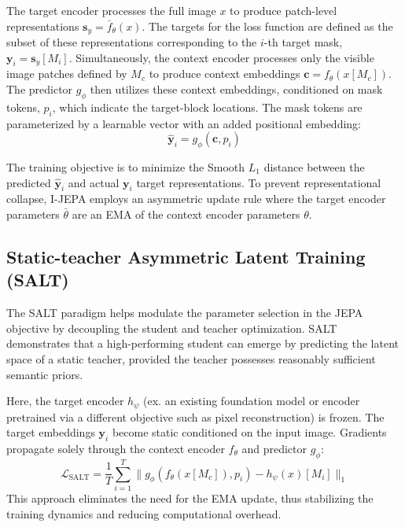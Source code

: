\documentclass{article}
\theoremstyle{plain}
\theoremstyle{definition}
\theoremstyle{remark}
\begin{document}
The target encoder processes the full image $x$ to produce patch-level representations $\mathbf{s}_y = \bar{f}_\theta(x)$. The targets for the loss function are defined as the subset of these representations corresponding to the $i$-th target mask, $\mathbf{y}_i = \mathbf{s}_y[M_i]$. Simultaneously, the context encoder processes only the visible image patches defined by $M_c$ to produce context embeddings $\mathbf{c} = f_\theta(x[M_c])$. The predictor $g_\phi$ then utilizes these context embeddings, conditioned on mask tokens, $p_i$, which indicate the target-block locations. The mask tokens are parameterized by a learnable vector with an added positional embedding:
\begin{equation}
    \hat{\mathbf{y}}_i = g_\phi(\mathbf{c}, p_i)
\end{equation}

The training objective is to minimize the Smooth $L_1$ distance between the predicted $\hat{\mathbf{y}}_i$ and actual $\mathbf{y}_i$ target representations. To prevent representational collapse, I-JEPA employs an asymmetric update rule where the target encoder parameters $\bar{\theta}$ are an EMA of the context encoder parameters $\theta$.

\subsection{Static-teacher Asymmetric Latent Training (SALT)}

The SALT paradigm \cite{li_rethinking_2025} helps modulate the parameter selection in the JEPA objective by decoupling the student and teacher optimization. SALT demonstrates that a high-performing student can emerge by predicting the latent space of a static teacher, provided the teacher possesses reasonably sufficient semantic priors.

Here, the target encoder $h_\psi$ (ex. an existing foundation model or encoder pretrained via a different objective such as pixel reconstruction) is frozen. The target embeddings $\mathbf{y}_i$ become static conditioned on the input image. Gradients propagate solely through the context encoder $f_\theta$ and predictor $g_\phi$:
\begin{equation}
\mathcal{L}_{\text{SALT}} = \frac{1}{T} \sum_{i=1}^{T} \| g_\phi(f_\theta(x[M_c]), p_i) - h_\psi(x)[M_i] \|_1
\end{equation}
This approach eliminates the need for the EMA update, thus stabilizing the training dynamics and reducing computational overhead.
\end{document}
